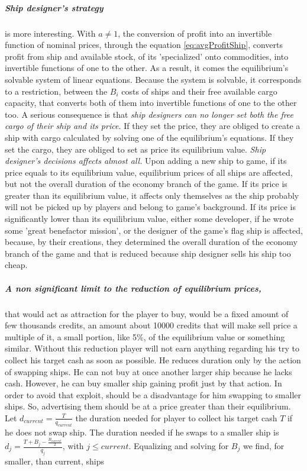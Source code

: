 \documentclass[]{article}
\begin{document}
\subparagraph{Ship designer's strategy}\label{designers_strategy} is more interesting. With $a\ne1$, the conversion of profit into an invertible function of nominal prices, through the equation \eqref{eq:avgProfitShip}, converts profit from ship and available stock, of its 'specialized' onto commodities, into invertible functions of one to the other. As a result, it comes the equilibrium's solvable system of linear equations. Because the system is solvable, it corresponds to a restriction, between the $B_{i}$ costs of ships  and their free available cargo capacity, that converts both of them into invertible functions of one to the other too. A serious consequence is that \emph{ship designers can no longer set both the free cargo of their ship and its price.} If they set the price, they are obliged to create a ship with cargo calculated by solving one of the equilibrium's equations. If they set the cargo, they are obliged to set as price its equilibrium value. \emph{Ship designer's decisions affects almost all.} Upon adding a new ship to game, if its price equals to its equilibrium value, equilibrium prices of all ships are affected, but not the overall duration of the economy branch of the game. If its price is greater than its equilibrium value, it affects only themselves as the ship probably will not be picked up by players and belong to game's background. If its price is significantly lower than its equilibrium value, either some developer, if he wrote some 'great benefactor mission', or the designer of the game's flag ship is affected, because, by their creations, they determined the overall duration of the economy branch of the game and that is reduced because ship designer sells his ship too cheap. 
\subparagraph*{A non significant limit to the reduction of equilibrium prices,} that would act as attraction for the player to buy,  would be a fixed amount of few thousands credits, an amount about 10000 credits that will make sell price a multiple of it, a small portion, like 5\%, of the equilibrium value or something similar. Without this reduction player will not earn anything regarding his try to collect his target cash as soon as possible. He reduces duration only by the action of swapping ships. He can not buy at once another larger ship because he lacks cash. However, he can buy smaller ship gaining profit just by that action. In order to avoid that exploit, should be a disadvantage for him swapping to smaller ships. So, advertising them should be at a price greater than their equilibrium. Let $d_{current}=\tfrac{T}{q_{current}}$ the duration needed for player to collect his target cash $T$ if he does not swap ship. The duration needed if he swaps to a smaller ship is $d_{j}=\tfrac{T+B_{j}-\tfrac{B_{current}}{2}}{q_{j}}$, with $j\leq current$. Equalizing and solving for $B_{j}$ we find, for smaller, than current, ships
\end{document}
